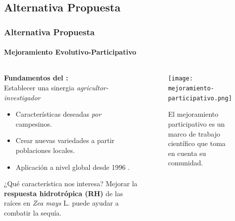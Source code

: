 \documentclass[9pt,aspectratio=169]{beamer}
\begin{document}
\subsection{Alternativa Propuesta}
\begin{frame}
\frametitle{Alternativa Propuesta}
\framesubtitle{Mejoramiento Evolutivo-Participativo}

\begin{columns}[c]
\begin{column}{0.45\textwidth}
    \textbf{Fundamentos del :}\\
    Establecer una sinergia \textit{agricultor-investigador}\\
    \begin{itemize}
        \item Características deseadas \textit{por} campesinos.
        \item Crear nuevas variedades a partir poblaciones locales.
        \item Aplicación a nivel global desde 1996 \cite{witcombe-1996-mejoramiento-a,witcombe-1996-mejoramiento-b} .
    \end{itemize} 

    \vspace{1em}

    \begin{exampleblock}{¿Qué característica nos interesa?}
        Mejorar la \textbf{respuesta hidrotrópica (RH)} de las raíces en \textit{Zea mays} L. puede ayudar a combatir la sequía.
    \end{exampleblock}
\end{column}

\begin{column}{0.45\textwidth}
    \begin{figure}[htb]
        \centering
        \texttt{[image: mejoramiento-participativo.png]}
        \caption{El mejoramiento participativo es un marco de trabajo científico que toma en cuenta su comunidad.}
        \label{fig:mejoramiento-participativo}
    \end{figure}
\end{column}
\end{columns}
    
\end{frame}
\end{document}
